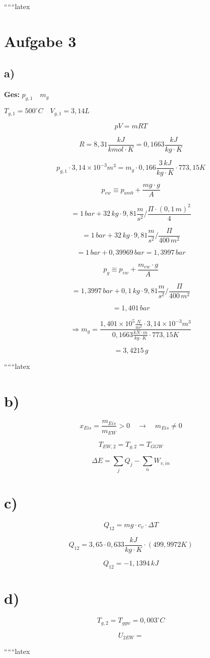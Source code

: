 
``````latex


\section*{Aufgabe 3}

\subsection*{a)}

\textbf{Ges:} \( p_{g,1} \quad m_g \)

\( T_{g,1} = 500^\circ C \quad V_{g,1} = 3,14L \)

\[
pV = mRT
\]

\[
R = 8,31 \frac{kJ}{kmol \cdot K} = 0,1663 \frac{kJ}{kg \cdot K}
\]

\[
p_{g,1} \cdot 3,14 \times 10^{-3} m^3 = m_g \cdot 0,166 \frac{3 \, kJ}{kg \cdot K} \cdot 773,15 K
\]

\[
p_{ew} \equiv p_{amb} + \frac{mg \cdot g}{A}
\]

\[
= 1 \, bar + 32 \, kg \cdot 9,81 \frac{m}{s^2} / \frac{\Pi \cdot (0,1 \, m)^2}{4}
\]

\[
= 1 \, bar + 32 \, kg \cdot 9,81 \frac{m}{s^2} / \frac{\Pi}{400 \, m^2}
\]

\[
= 1 \, bar + 0,39969 \, bar = 1,3997 \, bar
\]

\[
p_g \equiv p_{ew} + \frac{m_{ew} \cdot g}{A}
\]

\[
= 1,3997 \, bar + 0,1 \, kg \cdot 9,81 \frac{m}{s^2} / \frac{\Pi}{400 \, m^2}
\]

\[
= 1,401 \, bar
\]

\[
\Rightarrow m_g = \frac{1,401 \times 10^5 \frac{N}{m^2} \cdot 3,14 \times 10^{-3} m^3}{0,1663 \frac{kN \cdot m}{kg \cdot K} \cdot 773,15 K}
\]

\[
= 3,4215 \, g
\]

``````latex

\section*{b)}

\[
x_{Eis} = \frac{m_{Eis}}{m_{EW}} > 0 \quad \rightarrow \quad m_{Eis} \neq 0
\]

\[
T_{EW,2} = T_{g,2} = T_{GGW}
\]

\[
\Delta E = \sum_j Q_j - \sum_n W_{v,in}
\]

\section*{c)}

\[
Q_{12} = mg \cdot c_v \cdot \Delta T
\]

\[
Q_{12} = 3,65 \cdot 0,633 \frac{kJ}{kg \cdot K} \cdot (499,9972 K)
\]

\[
Q_{12} = -1,1394 \, kJ
\]

\section*{d)}

\[
T_{g,2} = T_{ggw} = 0,003^\circ C
\]

\[
U_{2EW} = 
\]

``````latex


